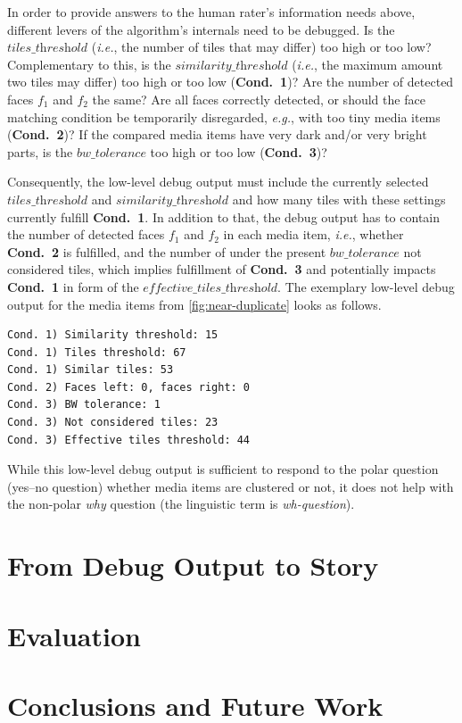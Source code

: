 \documentclass{article}
\begin{document}
In order to provide answers to the human rater's information needs above,
different levers of the algorithm's internals need to be debugged.
Is the $\textit{tiles\_threshold}$
(\emph{i.e.}, the number of tiles that may differ)
too high or too low?
Complementary to this, is the $\textit{similarity\_threshold}$
(\emph{i.e.}, the maximum amount two tiles may differ)
too high or too low (\textbf{Cond.~1})?
Are the number of detected faces $f_1$ and $f_2$ the same?
Are all faces correctly detected,
or should the face matching condition be temporarily disregarded,
\emph{e.g.}, with too tiny media items  (\textbf{Cond.~2})?
If the compared media items have very dark and/or very bright parts,
is the $\textit{bw\_tolerance}$ too high or too low (\textbf{Cond.~3})?

Consequently, the low-level debug output must include
the currently selected $\textit{tiles\_threshold}$ and
$\textit{similarity\_threshold}$
and how many tiles with these settings currently fulfill \textbf{Cond.~1}.
In addition to that, the debug output has to contain
the number of detected faces $f_1$ and $f_2$
in each media item, \emph{i.e.}, whether \textbf{Cond.~2} is fulfilled,
and the number of under the present $\textit{bw\_tolerance}$
not considered tiles, which implies fulfillment of \textbf{Cond.~3}
and potentially impacts \textbf{Cond.~1}
in form of the $\textit{effective\_tiles\_threshold}$.
The exemplary low-level debug output for the media items
from \autoref{fig:near-duplicate} looks as follows.

\begin{verbatim}
Cond. 1) Similarity threshold: 15
Cond. 1) Tiles threshold: 67
Cond. 1) Similar tiles: 53
Cond. 2) Faces left: 0, faces right: 0
Cond. 3) BW tolerance: 1
Cond. 3) Not considered tiles: 23
Cond. 3) Effective tiles threshold: 44
\end{verbatim}

While this low-level debug output is sufficient to respond to the polar question
(yes--no question) whether media items are clustered or not,
it does not help with the non-polar \emph{why} question
(the linguistic term is \emph{wh-question}).

\section{From Debug Output to Story}
\label{sec:from-debug-output-to-story}

\section{Evaluation}
\label{sec:evaluation}

\section{Conclusions and Future Work}
\label{sec:conclusions-and-future-work}



\end{document}
